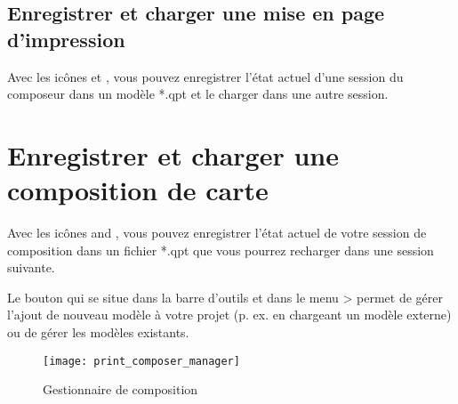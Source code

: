 \subsection{Enregistrer et charger une mise en page d'impression}

Avec les icônes  et , vous pouvez enregistrer l'état actuel d'une session du composeur dans un modèle *.qpt et le charger dans une autre session.

\section{Enregistrer et charger une composition de carte}

Avec les icônes  and , vous pouvez enregistrer l'état actuel de votre session de composition dans un fichier *.qpt que vous pourrez recharger dans une session suivante.

Le bouton  qui se situe dans la barre d'outils et dans le menu  >  permet de gérer l'ajout de nouveau modèle à votre projet (p. ex. en chargeant un modèle externe) ou de gérer les modèles existants.

\begin{figure}[h]
   \centering
   \texttt{[image: print\_composer\_manager]}   
   \caption{Gestionnaire de composition \nixcaption}
   \label{fig:print_composer_manager}
\end{figure}
